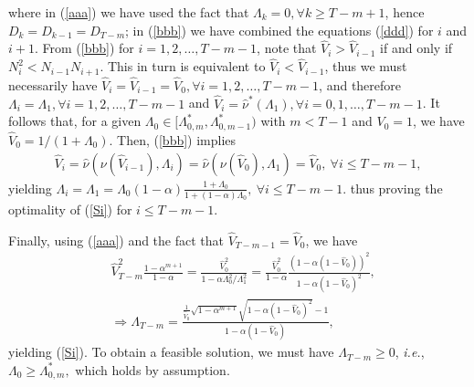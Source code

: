 \documentclass[10pt,twocolumn,twoside]{IEEEtran}
\theoremstyle{plain}
\newcommand{\nn}{\nonumber}
\begin{document}
where in (\ref{aaa}) we have used the fact that $\Lambda_k{=}0,\forall k{\geq}T{-}m{+}1$, hence $ D_k{=}D_{k-1}{=}D_{T-m}$;
in (\ref{bbb}) we have combined the equations (\ref{ddd}) for $i$ and $i{+}1$.
From (\ref{bbb})
for $i{=}1,2,\dots,T{-}m{-}1$, note that $\hat V_i{>}\hat V_{i-1}$ if and only if $N_{i}^2{<}N_{i-1}N_{i+1}$. 
 This in turn is equivalent to $\hat V_i{<}\hat V_{i-1}$,
thus we must necessarily have $\hat V_i{=}\hat V_{i-1}{=}\hat V_0,\forall i{=}1,2,\dots,T{-}m{-}1$,
and therefore $\Lambda_i{=}\Lambda_1,\forall i{=}1,2,\dots,T{-}m{-}1$ and
$\hat V_i{=}\hat\nu^*(\Lambda_1),\forall i{=}0,1,\dots,T{-}m{-}1$.
It follows that, for a given $\Lambda_0\in[\Lambda_{0,m}^*,\Lambda_{0,m-1}^*)$ with $m<T-1$ and $V_0=1$, we have $\hat V_0=1/(1+\Lambda_0)$.
Then, (\ref{bbb}) implies
\begin{align*}
\hat V_i
=
\hat\nu(\nu(\hat V_{i-1}),\Lambda_i)
=
\hat\nu(\nu(\hat V_{0}),\Lambda_1)
=\hat V_0,
\ \forall i\leq T-m-1,
\end{align*}
yielding
$
\Lambda_i=\Lambda_1
=
\Lambda_0
(1-\alpha)\frac{1+\Lambda_0}
{
1+(1-\alpha)\Lambda_0
},\ \forall i\leq T-m-1.
$
thus proving the optimality of  (\ref{Si}) for $i\leq T-m-1$.

Finally, using (\ref{aaa}) and the fact that $\hat V_{T-m-1}=\hat V_0$, we have
\begin{align*}
&\hat V_{T-m}^2\frac{1-\alpha^{m+1}}{1-\alpha}
=
\frac{\hat V_{0}^2}{1-\alpha\Lambda_{0}^2/\Lambda_{1}^2}
=
\frac{\hat V_{0}^2}{1-\alpha}\frac{(1-\alpha(1-\hat V_0))^2}{1-\alpha(1-\hat V_0)^2},
\nn\\
&\Rightarrow\Lambda_{T-m}
=
 \frac{\frac{1}{\hat V_0}\sqrt{1-\alpha^{m+1}}\sqrt{1-\alpha(1-\hat V_0)^2}-1}{1-\alpha(1-\hat V_0)},
\end{align*}
yielding (\ref{Si}).
To obtain a feasible solution, we must have $\Lambda_{T-m}\geq 0$, \emph{i.e.},
$\!\Lambda_0\!\geq\Lambda_{0,m}^*,
$
which holds by assumption.
\end{document}
